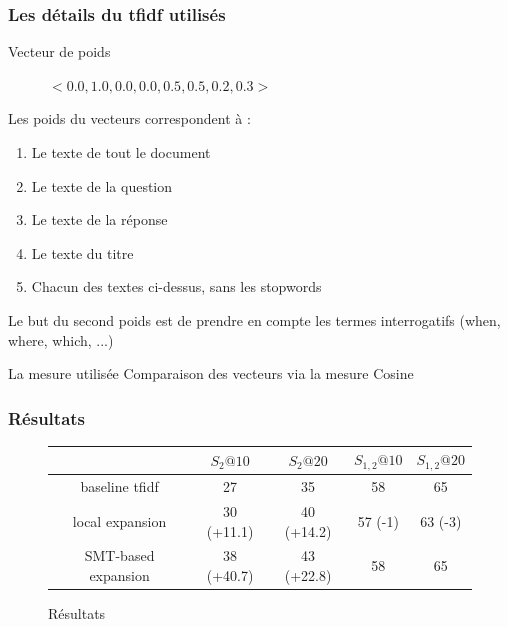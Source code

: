 \documentclass[10pt]{beamer}
\begin{document}
\begin{frame}
  \frametitle{Les détails du tfidf utilisés}

  \begin{block}{Vecteur de poids}
    \begin{figure}[h]
      \centering
      $<0.0, 1.0, 0.0, 0.0, 0.5, 0.5, 0.2, 0.3>$
    \end{figure}
    
    
    Les poids du vecteurs correspondent à :

    \begin{enumerate}
    \item Le texte de tout le document
    \item Le texte de la question
    \item Le texte de la réponse
    \item Le texte du titre
    \item Chacun des textes ci-dessus, sans les stopwords
    \end{enumerate}

    Le but du second poids est de prendre en compte les termes
    interrogatifs (when, where, which, ...)

  \end{block}
  \pause
  \begin{block}{La mesure utilisée}
    Comparaison des vecteurs via la mesure Cosine
  \end{block}

\end{frame}

\begin{frame}
  \frametitle{Résultats}
  \begin{figure}[h]
    \centering
    \begin{tabular}[h]{|c|c|c|c|c|}
    \hline
    & $S_2@10$ & $S_2@20$ & $S_{1,2}@10$ & $S_{1,2}@20$\\
    \hline
    baseline tfidf & 27 & 35 & 58 & 65\\
    local expansion & 30 (+11.1) & 40 (+14.2) & 57 (-1) & 63 (-3)\\
    SMT-based expansion & 38 (+40.7) & 43 (+22.8) & 58 & 65\\
    \hline
  \end{tabular}

    \caption{Résultats}
    \label{fig:res}
  \end{figure}

\end{frame}
\end{document}
